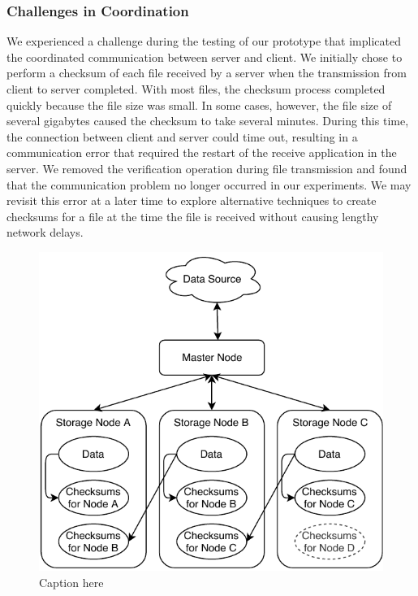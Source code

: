 \subsubsection{Challenges in Coordination}
We experienced a challenge during the testing of our prototype that implicated the coordinated communication between server and client.  We initially chose to perform a checksum of each file received by a server when the transmission from client to server completed.  With most files, the checksum process completed quickly because the file size was small.  In some cases, however, the file size of several gigabytes caused the checksum to take several minutes.  During this time, the connection between client and server could time out, resulting in a communication error that required the restart of the receive application in the server.  We removed the verification operation during file transmission and found that the communication problem no longer occurred in our experiments.  We may revisit this error at a later time to explore alternative techniques to create checksums for a file at the time the file is received without causing lengthy network delays.

\begin{figure}[!ht]
\includegraphics[width=\linewidth]{fig4.pdf}
\caption{Caption here}
\label{fig4}
\end{figure}

